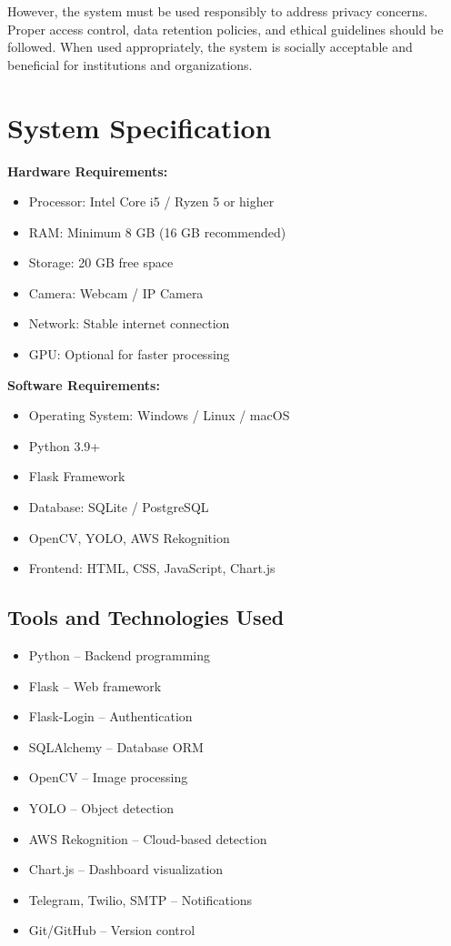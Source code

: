 \documentclass[10pt,openany]{report}
\begin{document}
\begin{sloppypar}
{{{\begin{sloppypar}
However, the system must be used responsibly to address privacy concerns. Proper access control, data retention policies, and ethical guidelines should be followed. When used appropriately, the system is socially acceptable and beneficial for institutions and organizations.

\section{System Specification}

\textbf{Hardware Requirements:}
\begin{itemize}
\item Processor: Intel Core i5 / Ryzen 5 or higher
\item RAM: Minimum 8 GB (16 GB recommended)
\item Storage: 20 GB free space
\item Camera: Webcam / IP Camera
\item Network: Stable internet connection
\item GPU: Optional for faster processing
\end{itemize}

\textbf{Software Requirements:}
\begin{itemize}
\item Operating System: Windows / Linux / macOS
\item Python 3.9+
\item Flask Framework
\item Database: SQLite / PostgreSQL
\item OpenCV, YOLO, AWS Rekognition
\item Frontend: HTML, CSS, JavaScript, Chart.js
\end{itemize}

\subsection{Tools and Technologies Used}

\begin{itemize}
\item Python – Backend programming
\item Flask – Web framework
\item Flask-Login – Authentication
\item SQLAlchemy – Database ORM
\item OpenCV – Image processing
\item YOLO – Object detection
\item AWS Rekognition – Cloud-based detection
\item Chart.js – Dashboard visualization
\item Telegram, Twilio, SMTP – Notifications
\item Git/GitHub – Version control
\end{itemize}


\end{sloppypar}}}}
\end{sloppypar}
\end{document}
